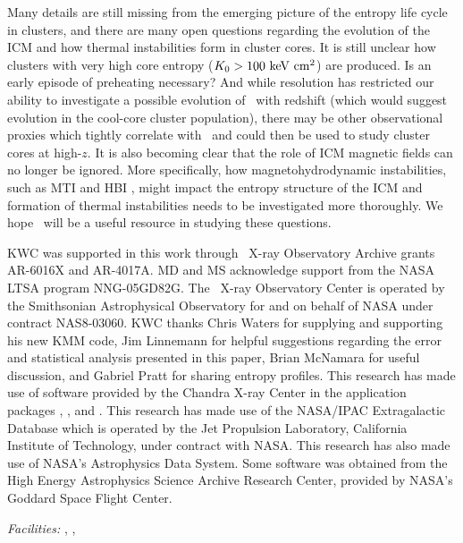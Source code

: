 \documentclass[12pt,preprint]{aastex}
\begin{document}
Many details are still missing from the emerging picture of the
entropy life cycle in clusters, and there are many open questions
regarding the evolution of the ICM and how thermal instabilities form
in cluster cores. It is still unclear how clusters with very high core
entropy ($K_0 > 100 \mathrm{\mbox{\ensuremath{\mathrm{~keV}}} \mathrm{\mbox{\ensuremath{\mathrm{~cm}}}^2}}$) are produced. Is an early episode of
preheating necessary? And while resolution has restricted our ability
to investigate a possible evolution of \kna\ with redshift (which
would suggest evolution in the cool-core cluster population), there
may be other observational proxies which tightly correlate with
\kna\ and could then be used to study cluster cores at high-$z$. It is
also becoming clear that the role of ICM magnetic fields can no longer
be ignored. More specifically, how magnetohydrodynamic instabilities,
such as MTI \citep{2000ApJ...534..420B, 2008ApJ...673..758Q} and HBI
\citep{2008ApJ...677L...9P}, might impact the entropy structure of the
ICM and formation of thermal instabilities needs to be investigated
more thoroughly. We hope \accept\ will be a useful resource in
studying these questions.

\acknowledgements

KWC was supported in this work through \chandra\ X-ray Observatory
Archive grants AR-6016X and AR-4017A. MD and MS acknowledge support
from the NASA LTSA program NNG-05GD82G. The \chandra\ X-ray
Observatory Center is operated by the Smithsonian Astrophysical
Observatory for and on behalf of NASA under contract NAS8-03060. KWC
thanks Chris Waters for supplying and supporting his new KMM code, Jim
Linnemann for helpful suggestions regarding the error and statistical
analysis presented in this paper, Brian McNamara for useful
discussion, and Gabriel Pratt for sharing entropy profiles. This
research has made use of software provided by the Chandra X-ray Center
in the application packages \ciao, \chips, and \sherpa. This research
has made use of the NASA/IPAC Extragalactic Database which is operated
by the Jet Propulsion Laboratory, California Institute of Technology,
under contract with NASA. This research has also made use of NASA's
Astrophysics Data System. Some software was obtained from the High
Energy Astrophysics Science Archive Research Center, provided by
NASA's Goddard Space Flight Center.

{\it Facilities:} , , 
\end{document}
